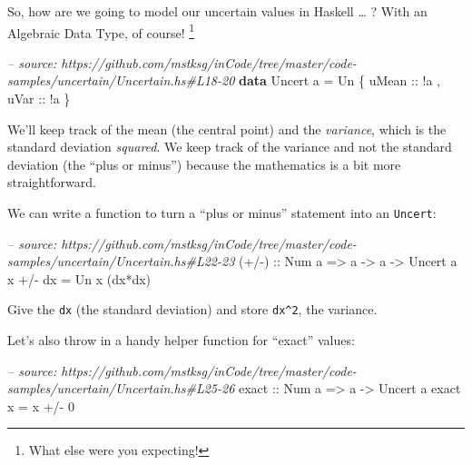 \documentclass[]{article}
\newenvironment{Shaded}{}{}
\newcommand{\KeywordTok}[1]{\textcolor[rgb]{0.00,0.44,0.13}{\textbf{{#1}}}}
\newcommand{\DataTypeTok}[1]{\textcolor[rgb]{0.56,0.13,0.00}{{#1}}}
\newcommand{\DecValTok}[1]{\textcolor[rgb]{0.25,0.63,0.44}{{#1}}}
\newcommand{\CommentTok}[1]{\textcolor[rgb]{0.38,0.63,0.69}{\textit{{#1}}}}
\newcommand{\OtherTok}[1]{\textcolor[rgb]{0.00,0.44,0.13}{{#1}}}
\newcommand{\FunctionTok}[1]{\textcolor[rgb]{0.02,0.16,0.49}{{#1}}}
\newcommand{\NormalTok}[1]{{#1}}
\begin{document}
So, how are we going to model our uncertain values in Haskell \ldots{} ?
With an Algebraic Data Type, of course! \footnote{What else were you
  expecting!}

\begin{Shaded}
\begin{Highlighting}[]
\CommentTok{-- source: https://github.com/mstksg/inCode/tree/master/code-samples/uncertain/Uncertain.hs#L18-20}
\KeywordTok{data} \DataTypeTok{Uncert} \NormalTok{a }\FunctionTok{=} \DataTypeTok{Un} \NormalTok{\{}\OtherTok{ uMean ::} \FunctionTok{!}\NormalTok{a}
                   \NormalTok{,}\OtherTok{ uVar  ::} \FunctionTok{!}\NormalTok{a}
                   \NormalTok{\}}
\end{Highlighting}
\end{Shaded}

We'll keep track of the mean (the central point) and the
\emph{variance}, which is the standard deviation \emph{squared}. We keep
track of the variance and not the standard deviation (the ``plus or
minus'') because the mathematics is a bit more straightforward.

We can write a function to turn a ``plus or minus'' statement into an
\texttt{Uncert}:

\begin{Shaded}
\begin{Highlighting}[]
\CommentTok{-- source: https://github.com/mstksg/inCode/tree/master/code-samples/uncertain/Uncertain.hs#L22-23}
\OtherTok{(+/-) ::} \DataTypeTok{Num} \NormalTok{a }\OtherTok{=>} \NormalTok{a }\OtherTok{->} \NormalTok{a }\OtherTok{->} \DataTypeTok{Uncert} \NormalTok{a}
\NormalTok{x }\FunctionTok{+/-} \NormalTok{dx }\FunctionTok{=} \DataTypeTok{Un} \NormalTok{x (dx}\FunctionTok{*}\NormalTok{dx)}
\end{Highlighting}
\end{Shaded}

Give the \texttt{dx} (the standard deviation) and store
\texttt{dx\^{}2}, the variance.

Let's also throw in a handy helper function for ``exact'' values:

\begin{Shaded}
\begin{Highlighting}[]
\CommentTok{-- source: https://github.com/mstksg/inCode/tree/master/code-samples/uncertain/Uncertain.hs#L25-26}
\OtherTok{exact ::} \DataTypeTok{Num} \NormalTok{a }\OtherTok{=>} \NormalTok{a }\OtherTok{->} \DataTypeTok{Uncert} \NormalTok{a}
\NormalTok{exact x }\FunctionTok{=} \NormalTok{x }\FunctionTok{+/-} \DecValTok{0}
\end{Highlighting}
\end{Shaded}
\end{document}
